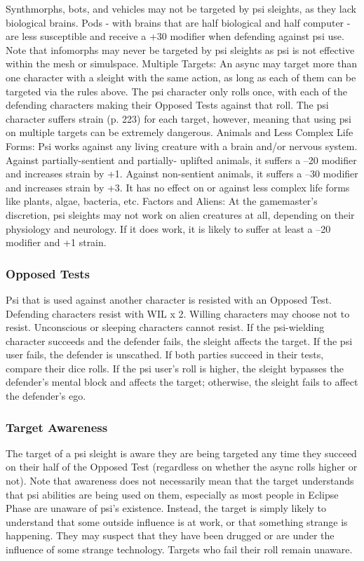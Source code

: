 Synthmorphs, bots, and vehicles may not be targeted
by psi sleights, as they lack biological brains. Pods
- with brains that are half biological and half computer -
are less susceptible and receive a +30 modifier
when defending against psi use. Note that infomorphs
may never be targeted by psi sleights as psi is not effective
within the mesh or simulspace.
Multiple Targets: An async may target more than
one character with a sleight with the same action, as
long as each of them can be targeted via the rules
above. The psi character only rolls once, with each of
the defending characters making their Opposed Tests
against that roll. The psi character suffers strain (p.
223) for each target, however, meaning that using psi
on multiple targets can be extremely dangerous.
Animals and Less Complex Life Forms: Psi works
against any living creature with a brain and/or
nervous system. Against partially-sentient and partially-
uplifted animals, it suffers a –20 modifier and
increases strain by +1. Against non-sentient animals,
it suffers a –30 modifier and increases strain by +3. It
has no effect on or against less complex life forms like
plants, algae, bacteria, etc.
Factors and Aliens: At the gamemaster’s discretion,
psi sleights may not work on alien creatures at all, depending
on their physiology and neurology. If it does
work, it is likely to suffer at least a –20 modifier and
+1 strain.

\subsubsection{Opposed Tests}

Psi that is used against another character is resisted
with an Opposed Test. Defending characters resist with
WIL x 2. Willing characters may choose not to resist.
Unconscious or sleeping characters cannot resist.
If the psi-wielding character succeeds and the defender
fails, the sleight affects the target. If the psi user
fails, the defender is unscathed. If both parties succeed
in their tests, compare their dice rolls. If the psi
user’s roll is higher, the sleight bypasses the defender’s
mental block and affects the target; otherwise, the
sleight fails to affect the defender’s ego.

\subsubsection{Target Awareness}

The target of a psi sleight is aware they are being
targeted any time they succeed on their half of the
Opposed Test (regardless on whether the async
rolls higher or not). Note that awareness does not
necessarily mean that the target understands that psi
abilities are being used on them, especially as most
people in Eclipse Phase are unaware of psi’s existence.
Instead, the target is simply likely to understand that
some outside influence is at work, or that something
strange is happening. They may suspect that they
have been drugged or are under the influence of some
strange technology.
Targets who fail their roll remain unaware.

